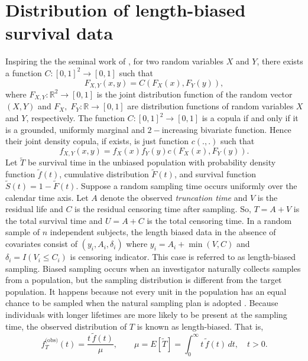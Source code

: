 \documentclass[twoside]{article}
\begin{document}
\section{Distribution of length-biased survival data} 
Inspiring the the seminal work of  \cite{sklar1959fonctions}, for two random variables $X$ and $Y$, there exists  a function $C: \left[0,1 \right]^2 \rightarrow \left[0,1 \right] $
such that
\begin{equation}
\label{eq:1-4}
F_{X,Y}(x,y)=C(F_X(x),F_Y(y)),
\end{equation}
where $F_{X,Y}: \mathbb{R}^2 \rightarrow \left[0,1 \right] $
is the joint distribution function of  the random vector $({X,Y})$ and $F_X,\; F_Y: \mathbb{R} \rightarrow \left[0,1 \right]$ are distribution functions of random variables $X$ and $Y$, respectively.  The function $C: \left[0,1 \right]^2 \rightarrow \left[0,1 \right] $ is a copula if and only if it is a  grounded, uniformly marginal and $2-$increasing bivariate function. Hence their joint density copula, if exists, is just function $c(.,.)$ such that
\begin{equation}
\label{eq:1-5}
f_{X,Y}(x,y)=f_X(x)f_Y(y)c(F_X(x),F_Y(y)).
\end{equation}
Let $\tilde{T}$ be survival time in the unbiased population with probability density function $\tilde{f}(t)$, cumulative distribution $\tilde{F}(t)$, and survival function $\tilde{S}(t)=1-\tilde{F}(t)$.
Suppose a random sampling time occurs uniformly over the calendar time axis.
Let $A$ denote the observed \emph{ truncation time} and $V$ is
the residual life  and $C$ is the residual censoring time after sampling.
So, $T=A+V$ is the total survival time and $U=A+C$ is the total censoring time.
In a random sample of $n$ independent subjects, the length biased data in the absence of covariates consist of $(y_i,A_i,{\delta_i})$ 
where $y_i=A_i+\min(V,C)$  and ${\delta_i}=I(V_i\leqslant C_i)$ is censoring indicator.
This case  is referred to as length-biased sampling. Biased sampling occurs when an investigator naturally collects samples from a population, but the sampling distribution is different from the target population. It happens because not every unit in the population has an equal chance to be sampled when the natural sampling plan is adopted \cite{qin2017biased}. Because individuals with longer lifetimes are more likely to be present at the
sampling time, the observed distribution of $T$ is known as length-biased.  That is,
$$  f_T^{\text{(obs)}}(t)
  = \frac{t\,\tilde{f}(t)}{\mu}, \qquad
  \mu = E[\tilde{T}] = \int_0^\infty t\,\tilde{f}(t)\,dt,
  \quad t>0.$$
\end{document}
